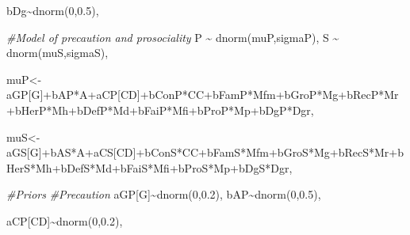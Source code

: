 \documentclass[
]{book}
\newenvironment{Shaded}{\begin{snugshade}}{\end{snugshade}}
\newcommand{\CommentTok}[1]{\textcolor[rgb]{0.56,0.35,0.01}{\textit{#1}}}
\newcommand{\DecValTok}[1]{\textcolor[rgb]{0.00,0.00,0.81}{#1}}
\newcommand{\FloatTok}[1]{\textcolor[rgb]{0.00,0.00,0.81}{#1}}
\newcommand{\FunctionTok}[1]{\textcolor[rgb]{0.00,0.00,0.00}{#1}}
\newcommand{\NormalTok}[1]{#1}
\newcommand{\OtherTok}[1]{\textcolor[rgb]{0.56,0.35,0.01}{#1}}
\newcommand{\SpecialCharTok}[1]{\textcolor[rgb]{0.00,0.00,0.00}{#1}}
\begin{document}
\begin{Shaded}
\begin{Highlighting}[]
\NormalTok{    bDg}\SpecialCharTok{\textasciitilde{}}\FunctionTok{dnorm}\NormalTok{(}\DecValTok{0}\NormalTok{,}\FloatTok{0.5}\NormalTok{),}
    
    
    \CommentTok{\#Model of precaution and prosociality}
\NormalTok{    P }\SpecialCharTok{\textasciitilde{}} \FunctionTok{dnorm}\NormalTok{(muP,sigmaP),}
\NormalTok{    S }\SpecialCharTok{\textasciitilde{}} \FunctionTok{dnorm}\NormalTok{(muS,sigmaS),}

\NormalTok{    muP}\OtherTok{\textless{}{-}}\NormalTok{aGP[G]}\SpecialCharTok{+}\NormalTok{bAP}\SpecialCharTok{*}\NormalTok{A}\SpecialCharTok{+}\NormalTok{aCP[CD]}\SpecialCharTok{+}\NormalTok{bConP}\SpecialCharTok{*}\NormalTok{CC}\SpecialCharTok{+}\NormalTok{bFamP}\SpecialCharTok{*}\NormalTok{Mfm}\SpecialCharTok{+}\NormalTok{bGroP}\SpecialCharTok{*}\NormalTok{Mg}\SpecialCharTok{+}\NormalTok{bRecP}\SpecialCharTok{*}\NormalTok{Mr}\SpecialCharTok{+}\NormalTok{bHerP}\SpecialCharTok{*}\NormalTok{Mh}\SpecialCharTok{+}\NormalTok{bDefP}\SpecialCharTok{*}\NormalTok{Md}\SpecialCharTok{+}\NormalTok{bFaiP}\SpecialCharTok{*}\NormalTok{Mfi}\SpecialCharTok{+}\NormalTok{bProP}\SpecialCharTok{*}\NormalTok{Mp}\SpecialCharTok{+}\NormalTok{bDgP}\SpecialCharTok{*}\NormalTok{Dgr,}
    
\NormalTok{    muS}\OtherTok{\textless{}{-}}\NormalTok{aGS[G]}\SpecialCharTok{+}\NormalTok{bAS}\SpecialCharTok{*}\NormalTok{A}\SpecialCharTok{+}\NormalTok{aCS[CD]}\SpecialCharTok{+}\NormalTok{bConS}\SpecialCharTok{*}\NormalTok{CC}\SpecialCharTok{+}\NormalTok{bFamS}\SpecialCharTok{*}\NormalTok{Mfm}\SpecialCharTok{+}\NormalTok{bGroS}\SpecialCharTok{*}\NormalTok{Mg}\SpecialCharTok{+}\NormalTok{bRecS}\SpecialCharTok{*}\NormalTok{Mr}\SpecialCharTok{+}\NormalTok{bHerS}\SpecialCharTok{*}\NormalTok{Mh}\SpecialCharTok{+}\NormalTok{bDefS}\SpecialCharTok{*}\NormalTok{Md}\SpecialCharTok{+}\NormalTok{bFaiS}\SpecialCharTok{*}\NormalTok{Mfi}\SpecialCharTok{+}\NormalTok{bProS}\SpecialCharTok{*}\NormalTok{Mp}\SpecialCharTok{+}\NormalTok{bDgS}\SpecialCharTok{*}\NormalTok{Dgr,}
    
    \CommentTok{\#Priors}
    \CommentTok{\#Precaution}
\NormalTok{    aGP[G]}\SpecialCharTok{\textasciitilde{}}\FunctionTok{dnorm}\NormalTok{(}\DecValTok{0}\NormalTok{,}\FloatTok{0.2}\NormalTok{),}
\NormalTok{    bAP}\SpecialCharTok{\textasciitilde{}}\FunctionTok{dnorm}\NormalTok{(}\DecValTok{0}\NormalTok{,}\FloatTok{0.5}\NormalTok{),}
    
\NormalTok{    aCP[CD]}\SpecialCharTok{\textasciitilde{}}\FunctionTok{dnorm}\NormalTok{(}\DecValTok{0}\NormalTok{,}\FloatTok{0.2}\NormalTok{),}
    

\end{Highlighting}
\end{Shaded}
\end{document}
